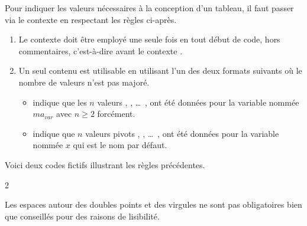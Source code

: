 \documentclass[10pt, a4paper]{article}
\begin{document}
Pour indiquer les valeurs nécessaires à la conception d'un tableau, il faut passer via le contexte  en respectant les règles ci-après.
%
\begin{enumerate}
    \item Le contexte  doit être employé une seule fois en tout début de code, hors commentaires, c'est-à-dire avant le contexte .


    \item Un seul contenu est utilisable en utilisant l'un des deux formats suivants où le nombre de valeurs n'est pas majoré.
    \begin{itemize}
        \item {} indique que les $n$ valeurs  ,  , \dots\ ,  ont été données pour la variable nommée $ma_{var}$ avec $n \geq 2$ forcément.

        \item {} indique que $n$ valeurs pivots  ,  , \dots\ ,  ont été données pour la variable nommée $x$ qui est le nom par défaut.
    \end{itemize}
\end{enumerate}


\medskip


Voici deux codes fictifs illustrant les règles précédentes.
\begin{multicols}{2}

\end{multicols}




\begin{tdocnote}
    Les espaces autour des doubles points et des virgules ne sont pas obligatoires bien que conseillés pour des raisons de lisibilité.
\end{tdocnote}


\end{document}
